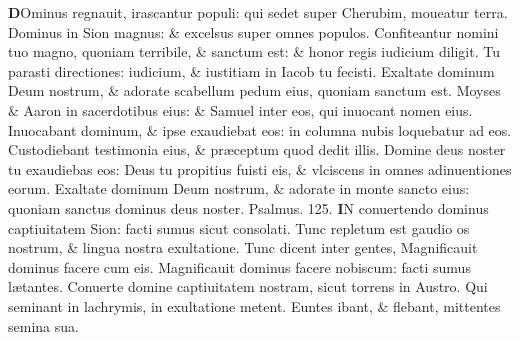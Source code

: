 \documentclass[a5paper,10pt]{book}
\def\ae{æ}
\begin{document}
\begin{multicols*}{2}
\vspace{-.5em}
\lettrine[lines=2]{\bfseries \color{red} D}{}Ominus regnauit, irascantur populi: qui sedet super Cherubim, moueatur terra.
\newline \color{red} D\color{black}ominus in Sion magnus: \& excelsus super omnes populos.
\newline \color{red} C\color{black}onfiteantur nomini tuo magno, quoniam terribile, \& sanctum est: \& honor regis iudicium diligit.
\newline \color{red} T\color{black}u parasti directiones: iudicium, \& iustitiam in Iacob tu fecisti.
\newline \color{red} E\color{black}xaltate dominum Deum nostrum, \& adorate scabellum pedum eius, quoniam sanctum est.
\newline \color{red} M\color{black}oyses \& Aaron in sacerdotibus eius: \& Samuel inter eos, qui inuocant nomen eius.
\newline \color{red} I\color{black}nuocabant dominum, \& ipse exaudiebat eos: in columna nubis loquebatur ad eos.
\newline \color{red} C\color{black}ustodiebant testimonia eius, \& pr\ae ceptum quod dedit illis.
\newline \color{red} D\color{black}omine deus noster tu exaudiebas eos: Deus tu propitius fuisti eis, \& vlciscens in omnes adinuentiones eorum.
\newline \color{red} E\color{black}xaltate dominum Deum nostrum, \& adorate in monte sancto eius: quoniam sanctus dominus deus noster. \quad \color{red} Psalmus. \hypertarget{ps125}{125.} \color{black}
\lettrine[lines=2]{\bfseries \color{red} I}{}N conuertendo dominus captiuitatem Sion: facti sumus sicut consolati.
\newline \color{red} T\color{black}unc repletum est gaudio os nostrum, \& lingua nostra exultatione.
\newline \color{red} T\color{black}unc dicent inter gentes, Magnificauit dominus facere cum eis.
\newline \color{red} M\color{black}agnificauit dominus facere nobiscum: facti sumus l\ae tantes.
\newline \color{red} C\color{black}onuerte domine captiuitatem nostram, sicut torrens in Austro.
\newline \color{red} Q\color{black}ui seminant in lachrymis, in exultatione metent.
\newline \color{red} E\color{black}untes ibant, \& flebant, mittentes semina sua.

\end{multicols*}
\end{document}

